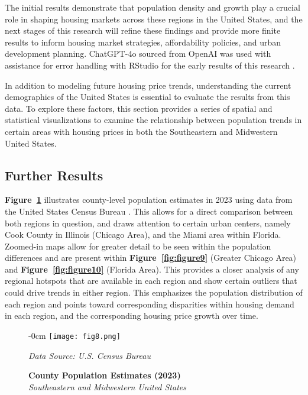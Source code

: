 \documentclass[journal,article,submit,pdftex,moreauthors]{Definitions/mdpi}
\begin{document}
The initial results demonstrate that population density and growth play a crucial role in shaping housing markets across these regions in the United States, and the next stages of this research will refine these findings and provide more finite results to inform housing market strategies, affordability policies, and urban development planning. ChatGPT-4o sourced from OpenAI was used with assistance for error handling with RStudio for the early results of this research \citep{openai_2025_chatgpt}.

In addition to modeling future housing price trends, understanding the current demographics of the United States is essential to evaluate the results from this data. To explore these factors, this section provides a series of spatial and statistical visualizations to examine the relationship between population trends in certain areas with housing prices in both the Southeastern and Midwestern United States.

\subsection{Further Results}

\textbf{Figure~\ref{fig:figure8}} illustrates county-level population estimates in 2023 using data from the United States Census Bureau \citep{_2023_county}. This allows for a direct comparison between both regions in question, and draws attention to certain urban centers, namely Cook County in Illinois (Chicago Area), and the Miami area within Florida. Zoomed-in maps allow for greater detail to be seen within the population differences and are present within \textbf{Figure~\ref{fig:figure9}} (Greater Chicago Area) and \textbf{Figure~\ref{fig:figure10}} (Florida Area). This provides a closer analysis of any regional hotspots that are available in each region and show certain outliers that could drive trends in either region. This emphasizes the population distribution of each region and points toward corresponding disparities within housing demand in each region, and the corresponding housing price growth over time.


\begin{figure}[H]
  \begin{adjustwidth}{-\extralength}{0cm}
    \centering
    \texttt{[image: fig8.png]}
    \caption{\textbf{County Population Estimates (2023)}\\\textit{Southeastern and Midwestern United States}}
    \label{fig:figure8}
    \vspace{1ex}
    {\footnotesize\textit{Data Source: U.S. Census Bureau}}
  \end{adjustwidth}
\end{figure}
\end{document}
